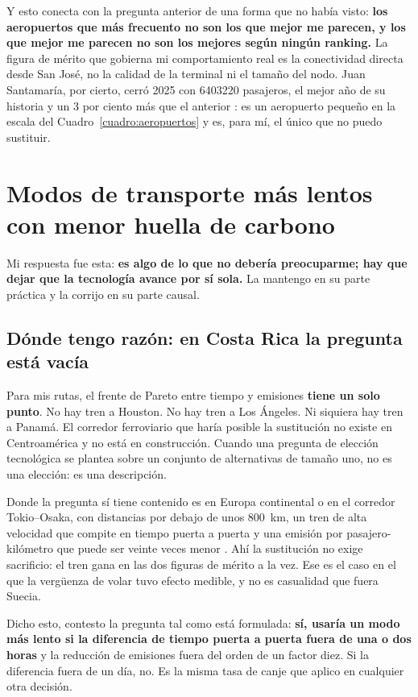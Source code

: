 \documentclass[11pt,letterpaper]{article}
\begin{document}
Y esto conecta con la pregunta anterior de una forma que no había visto:
\textbf{los aeropuertos que más frecuento no son los que mejor me parecen, y
los que mejor me parecen no son los mejores según ningún ranking.} La figura de
mérito que gobierna mi comportamiento real es la conectividad directa desde San
José, no la calidad de la terminal ni el tamaño del nodo. Juan Santamaría, por
cierto, cerró 2025 con \num{6403220} pasajeros, el mejor año de su historia y
un 3 por ciento más que el anterior \parencite{aeris2026}: es un aeropuerto
pequeño en la escala del Cuadro~\ref{cuadro:aeropuertos} y es, para mí, el
único que no puedo sustituir.

\section{Modos de transporte más lentos con menor huella de carbono}

Mi respuesta fue esta: \textbf{es algo de lo que no debería preocuparme; hay
que dejar que la tecnología avance por sí sola.} La mantengo en su parte
práctica y la corrijo en su parte causal.

\subsection*{Dónde tengo razón: en Costa Rica la pregunta está vacía}

Para mis rutas, el frente de Pareto entre tiempo y emisiones \textbf{tiene un
solo punto}. No hay tren a Houston. No hay tren a Los Ángeles. Ni siquiera hay
tren a Panamá. El corredor ferroviario que haría posible la sustitución no
existe en Centroamérica y no está en construcción. Cuando una pregunta de
elección tecnológica se plantea sobre un conjunto de alternativas de tamaño
uno, no es una elección: es una descripción.

Donde la pregunta sí tiene contenido es en Europa continental o en el corredor
Tokio--Osaka, con distancias por debajo de unos \SI{800}{\kilo\meter}, un tren
de alta velocidad que compite en tiempo puerta a puerta y una emisión por
pasajero-kilómetro que puede ser veinte veces menor \parencite{defra2025}. Ahí
la sustitución no exige sacrificio: el tren gana en las dos figuras de mérito a
la vez. Ese es el caso en el que la vergüenza de volar tuvo efecto medible, y
no es casualidad que fuera Suecia.

Dicho esto, contesto la pregunta tal como está formulada: \textbf{sí, usaría un
modo más lento si la diferencia de tiempo puerta a puerta fuera de una o dos
horas} y la reducción de emisiones fuera del orden de un factor diez. Si la
diferencia fuera de un día, no. Es la misma tasa de canje que aplico en
cualquier otra decisión.
\end{document}
